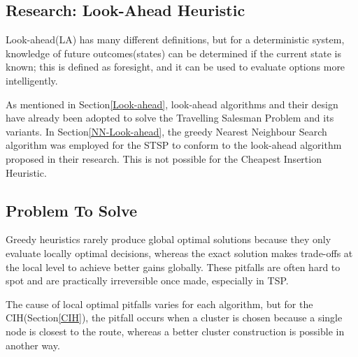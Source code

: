 \begin{center}
\section{Research: Look-Ahead Heuristic}
\end{center}

Look-ahead(LA) has many different definitions\cite{HARALICK1980263}, but for a deterministic system, knowledge of future outcomes(states) can be determined if the current state is known; this is defined as foresight, and it can be used to evaluate options more intelligently\cite{sharma2024notelookaheadreallife}.

As mentioned in Section\ref{Look-ahead}, look-ahead algorithms and their design have already been adopted to solve the Travelling Salesman Problem and its variants. In Section\ref{NN-Look-ahead}, the greedy Nearest Neighbour Search algorithm was employed for the STSP to conform to the look-ahead algorithm proposed in their research. This is not possible for the Cheapest Insertion Heuristic.

\subsection{Problem To Solve}
\label{problem}
Greedy heuristics rarely produce global optimal solutions because they only evaluate locally optimal decisions, whereas the exact solution makes trade-offs at the local level to achieve better gains globally\cite{BANGJENSEN2004121}. These pitfalls are often hard to spot and are practically irreversible once made, especially in TSP\cite{GUTIN200281}.


The cause of local optimal pitfalls varies for each algorithm, but for the CIH(Section\ref{CIH}), the pitfall occurs when a cluster is chosen because a single node is closest to the route, whereas a better cluster construction is possible in another way.

